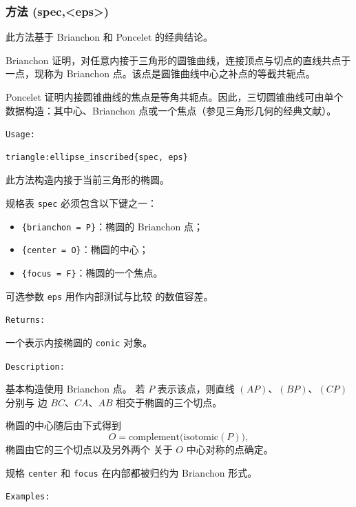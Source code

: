 \subsubsection{方法 (spec,<eps>)}%
\label{ssub:ellipse_inscribed}
此方法基于 Brianchon 和 Poncelet 的经典结论。

Brianchon 证明，对任意内接于三角形的圆锥曲线，连接顶点与切点的直线共点于一点，现称为 Brianchon 点。该点是圆锥曲线中心之补点的等截共轭点。

Poncelet 证明内接圆锥曲线的焦点是等角共轭点。因此，三切圆锥曲线可由单个数据构造：其中心、Brianchon 点或一个焦点（参见三角形几何的经典文献）。

\medskip
\texttt{Usage: }

\begin{verbatim}
triangle:ellipse_inscribed{spec, eps}
\end{verbatim}

\medskip

此方法构造内接于当前三角形的椭圆。

规格表 \texttt{spec} 必须包含以下键之一：

\begin{itemize}
\item \texttt{\{brianchon = P\}}：椭圆的 Brianchon 点；
\item \texttt{\{center = O\}}：椭圆的中心；
\item \texttt{\{focus = F\}}：椭圆的一个焦点。
\end{itemize}

可选参数 \texttt{eps} 用作内部测试与比较
的数值容差。

\medskip
\texttt{Returns: }

一个表示内接椭圆的 \texttt{conic} 对象。

\medskip
\texttt{Description: }

基本构造使用 Brianchon 点。
若 $P$ 表示该点，则直线 $(AP)$、$(BP)$、$(CP)$ 分别与
边 $BC$、$CA$、$AB$ 相交于椭圆的三个切点。

椭圆的中心随后由下式得到
\[
O = \text{complement}\bigl(\text{isotomic}(P)\bigr),
\]
椭圆由它的三个切点以及另外两个
关于 $O$ 中心对称的点确定。

规格 \texttt{center} 和 \texttt{focus} 在内部都被归约为
Brianchon 形式。

\medskip
\texttt{Examples: }


